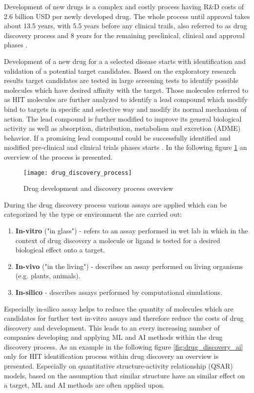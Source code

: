 \documentclass[../main.tex]{subfiles}
\begin{document}
Development of new drugs is a complex and costly process having R\&D costs of 2.6 billion USD per newly developed drug. The whole process until approval takes about 13.5 years, with 5.5 years before any clinical trails, also referred to as drug discovery process and 8 years for the remaining preclinical, clinical and approval phases \cite{kim_artificial_2020}.

Development of a new drug for a a selected disease starts with identification and validation of a potential target candidates. Based on the exploratory research results target candidates are tested in large screening tests to identify possible molecules which have desired affinity with the target. Those molecules referred to as HIT molecules are further analyzed to identify a lead compound which modify bind to targets in specific and selective way and modify its normal mechanism of action. The lead compound is further modified to improve its general biological activity as well as absorption, distribution, metabolism and excretion (ADME) behavior. If a promising lead compound could be successfully identified and modified pre-clinical and clinical trials phases starts \cite{duelen_medicinal_2019}. In the following figure \ref{fig:drug_discovery_process} an overview of the process is presented.

\begin{figure}[H]
    \centering
    \texttt{[image: drug\_discovery\_process]}    
    \caption{Drug development and discovery process overview \cite{duelen_medicinal_2019}}
    \label{fig:drug_discovery_process}
\end{figure}

During the drug discovery process various assays are applied which can be categorized by the type or environment the are carried out:

\begin{enumerate}
    \item \textbf{In-vitro} ("in glass") - refers to an assay performed in wet lab in which in the context of drug discovery a molecule or ligand is tested for a desired biological effect onto a target.
    \item \textbf{In-vivo} ("in the living") - describes an assay performed on living organisms (e.g. plants, animals).
    \item \textbf{In-silico} - describes assays performed by computational simulations.
\end{enumerate}

Especially in-silico assay helps to reduce the quantity of molecules which are candidates for further test in-vitro assays and therefore reduce the costs of drug discovery and development. This leads to an every increasing number of companies developing and applying ML and AI methods within the drug discovery process\cite{duelen_medicinal_2019}. As an example in the following figure \ref{fig:drug_discovery_ai} only for HIT identification process within drug discovery an overview is presented. Especially on quantitative structure-activity relationship (QSAR) models, based on the assumption that similar structure have an similar effect on a target, ML and AI methods are often applied upon. 
\end{document}
